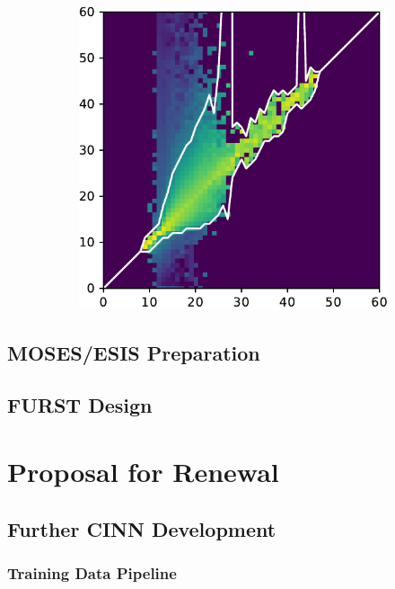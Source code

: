 \documentclass[10pt,letterpaper]{article}
\begin{document}
\begin{figure}[h!]
\begin{subfigure}[t]{0.32\textwidth}
					\end{subfigure}
					~ 
					\begin{subfigure}[t]{0.32\textwidth}
						\centering
						\includegraphics[width=\textwidth]{fig/hist_2}
					\end{subfigure}
					\caption{}
				\end{figure}
		
		\subsection{MOSES/ESIS Preparation}
		
		\subsection{FURST Design}
	
	\section{Proposal for Renewal}
	
		\subsection{Further CINN Development}
		
			\subsubsection{Training Data Pipeline}
		
\end{document}
